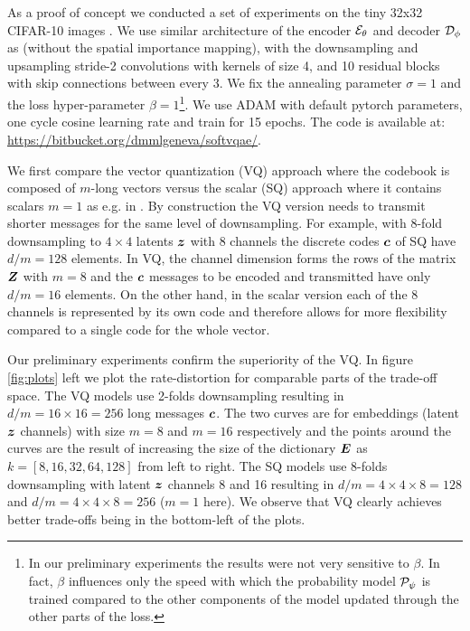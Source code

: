 \documentclass{article} %
\newcommand{\gEt}{\gE_\theta}
\newcommand{\gDp}{\gD_\phi}
\newcommand{\gPp}{\gP_{\psi}}
\begin{document}
As a proof of concept we conducted a set of experiments on the tiny 32x32 CIFAR-10 images \citep{krizhevskyLearningMultipleLayers2009}.
We use similar architecture of the encoder $\gEt$ and decoder $\gDp$ as \citet{mentzerConditionalProbabilityModels2018} (without the spatial importance mapping), with the downsampling and upsampling stride-2 convolutions with kernels of size 4, and 10 residual blocks with skip connections between every 3.
We fix the annealing parameter $\sigma=1$ and the loss hyper-parameter $\beta=1$\footnote{In our preliminary experiments the results were not very sensitive to $\beta$. In fact, $\beta$ influences only the speed with which the probability model $\gPp$ is trained compared to the other components of the model updated through the other parts of the loss.}.
We use ADAM with default pytorch parameters, one cycle cosine learning rate and train for 15 epochs.
The code is available at:
\url{https://bitbucket.org/dmmlgeneva/softvqae/}.

We first compare the vector quantization (VQ) approach where the codebook is composed of $m$-long vectors versus the scalar (SQ) approach where it contains scalars $m=1$ as e.g. in \cite{mentzerConditionalProbabilityModels2018}.
By construction the VQ version needs to transmit shorter messages for the same level of downsampling. For example, with 8-fold downsampling to $4 \times 4$ latents ${\bm{z}}$ with 8 channels the discrete codes ${\bm{c}}$ of SQ have $d/m = 128$ elements.
In VQ, the channel dimension forms the rows of the matrix ${\bm{Z}}$ with $m=8$ and the ${\bm{c}}$ messages to be encoded and transmitted have only $d/m = 16$ elements.
On the other hand, in the scalar version each of the 8 channels is represented by its own code and therefore allows for more flexibility compared to a single code for the whole vector.

Our preliminary experiments confirm the superiority of the VQ. In figure \ref{fig:plots} left we plot the rate-distortion for comparable parts of the trade-off space.
The VQ models use 2-folds downsampling resulting in $d/m = 16 \times 16 = 256$ long messages ${\bm{c}}$.
The two curves are for embeddings (latent ${\bm{z}}$ channels) with size $m=8$ and $m=16$ respectively and the points around the curves are the result of increasing the size of the dictionary ${\bm{E}}$ as $k = [8, 16, 32, 64, 128]$ from left to right.
The SQ models use 8-folds downsampling with latent ${\bm{z}}$ channels 8 and 16 resulting in $d/m = 4 \times 4 \times 8 = 128$ and $d/m = 4 \times 4 \times 8 = 256$ ($m=1$ here). We observe that VQ clearly achieves better trade-offs being in the bottom-left of the plots.
\end{document}

